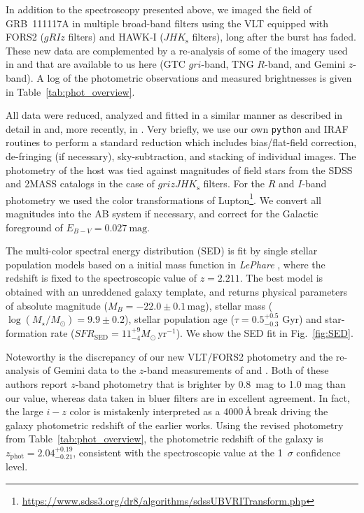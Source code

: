 \documentclass{aa}    %
\begin{document}
In addition to the spectroscopy presented above, we imaged the field of
GRB~111117A in multiple broad-band filters using the VLT equipped with FORS2
($gRIz$ filters) and HAWK-I ($JHK_{\mathrm{s}}$ filters), long after the burst
has faded. These new data are complemented by a re-analysis of some of the
imagery used in \citet{Margutti2012} and \citet{Sakamoto2013} that are available
to us here (GTC $gri$-band, TNG $R$-band, and Gemini $z$-band). A log of the
photometric observations and measured brightnesses is given in
Table~\ref{tab:phot_overview}.

All data were reduced, analyzed and fitted in a similar manner as described in detail in
\citet{Kruhler2011a} and, more recently, in \citet{Schulze2016}. Very briefly, we use our own
\texttt{python} and IRAF routines to perform a standard reduction which includes
bias/flat-field correction, de-fringing (if necessary), sky-subtraction, and
stacking of individual images. The photometry of the host was tied against magnitudes 
of field stars from the SDSS and 2MASS catalogs in the case of $grizJHK_{\mathrm{s}}$ filters. 
For the $R$ and $I$-band photometry we used the color transformations of
Lupton\footnote{\url{https://www.sdss3.org/dr8/algorithms/sdssUBVRITransform.php}}. 
We convert all magnitudes into the AB system if necessary, and correct for the Galactic 
foreground of $E_{B-V}=0.027~\mathrm{mag}$.

The multi-color spectral energy distribution (SED) is fit by \citet{Bruzual2003}
single stellar population models based on a \citet{Chabrier2003} initial mass
function in \emph{LePhare} \citep{Ilbert2006}, where the redshift is fixed to
the spectroscopic value of $z=2.211$. The best model is obtained with an
unreddened galaxy template, and returns physical parameters of absolute
magnitude ($M_B=-22.0\pm0.1$\,mag), stellar mass ($\log(M_{\star}/M_\odot) =
9.9\pm0.2$), stellar population age ($\tau = 0.5_{-0.3}^{+0.5}$ Gyr) and
star-formation rate ($SFR_{\mathrm{SED}}=11_{-4}^{+9}
M_\odot\,\mathrm{yr}^{-1}$). We show the SED fit in Fig.~\ref{fig:SED}.

Noteworthy is the discrepancy of our new VLT/FORS2 photometry and the
re-analysis of Gemini data to the $z$-band measurements of \citet{Margutti2012} and
\citet{Sakamoto2013}. Both of these authors report $z$-band photometry that is brighter 
by 0.8~mag to 1.0 mag than our value, whereas data taken in bluer filters are in excellent agreement. In fact, the large $i-z$ color is mistakenly interpreted as a 4000\,\AA\,break
driving the galaxy photometric redshift of the earlier works. Using
the revised photometry from Table~\ref{tab:phot_overview}, the photometric redshift of the
galaxy is $z_{\mathrm{phot}}=2.04_{-0.21}^{+0.19}$, consistent with the
spectroscopic value at the 1~$\sigma$ confidence level.
\end{document}
